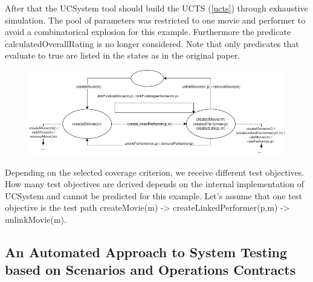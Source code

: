 After that the UCSystem tool should build the UCTS (\autoref{ucts}) through exhaustive simulation. The pool of parameters was restricted to one movie and performer to avoid a combinatorical explosion for this example. Furthermore the predicate calculatedOverallRating is no longer considered. Note that only predicates that evaluate to true are listed in the states as in the original paper. 

\begin{figure}[h]
	\centering
	\includegraphics[width=1.0\textwidth]{img/ucts.png}
	\label{ucts}
\end{figure}

Depending on the selected coverage criterion, we receive different test objectives. How many test objectives are derived depends on the internal implementation of UCSystem and cannot be predicted for this example. Let's assume that one test objective is the test path createMovie(m) -> createLinkedPerformer(p,m) -> unlinkMovie(m). 




\subsection{An Automated Approach to System Testing based on Scenarios and Operations Contracts}